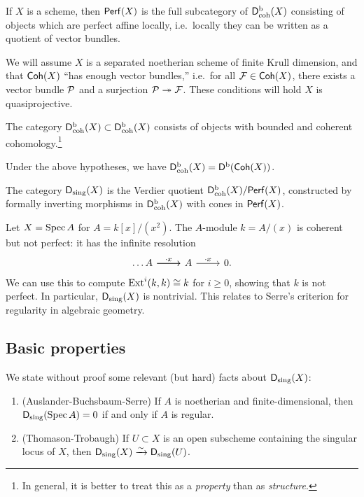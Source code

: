 \documentclass{article}
\begin{document}
\begin{dfn}
	If $X$ is a scheme, then $\mathsf{Perf}(X)$ is the full subcategory of $\mathsf{D}^\mathrm{b}_{\mathrm{coh}}(X)$ consisting of objects which are perfect affine locally, i.e.\ locally they can be written as a quotient of vector bundles.
\end{dfn}

We will assume $X$ is a separated noetherian scheme of finite Krull dimension, and that $\mathsf{Coh}(X)$ ``has enough vector bundles,'' i.e.\ for all $\mathcal{F} \in \mathsf{Coh}(X)$, there exists a vector bundle $\mathcal{P}$ and a surjection $\mathcal{P} \twoheadrightarrow \mathcal{F}$.
These conditions will hold $X$ is quasiprojective.

\begin{dfn}
	The category $\mathsf{D}^\mathrm{b}_{\mathrm{coh}}(X) \subset \mathsf{D}^\mathrm{b}_{\mathrm{coh}}(X)$ consists of objects with bounded and coherent cohomology.\footnote{In general, it is better to treat this as a \emph{property} than as \emph{structure}.}
\end{dfn}

Under the above hypotheses, we have $\mathsf{D}^\mathrm{b}_{\mathrm{coh}}(X) = \mathsf{D}^\mathrm{b}(\mathsf{Coh}(X))$.

\begin{dfn}
	The category $\mathsf{D}_{\mathrm{sing}}(X)$ is the Verdier quotient $\mathsf{D}^\mathrm{b}_{\mathrm{coh}}(X) / \mathsf{Perf}(X)$, constructed by formally inverting morphisms in $\mathsf{D}^\mathrm{b}_{\mathrm{coh}}(X)$ with cones in $\mathsf{Perf}(X)$.
\end{dfn}

\begin{ex}
	Let $X = \operatorname{Spec} A$ for $A = k[x] / (x^2)$.
	The $A$-module $k = A / (x)$ is coherent but not perfect: it has the infinite resolution
	\[
		\begin{tikzcd}
			\dots \rar A \rar["\cdot x"] & A \rar["\cdot x"] & 0.
		\end{tikzcd}
	\]
	We can use this to compute $\operatorname{Ext}^i(k, k) \cong k$ for $i \geq 0$, showing that $k$ is not perfect.
	In particular, $\mathsf{D}_{\mathrm{sing}}(X)$ is nontrivial.
	This relates to Serre's criterion for regularity in algebraic geometry.
\end{ex}

\subsection{Basic properties}

We state without proof some relevant (but hard) facts about $\mathsf{D}_{\mathrm{sing}}(X)$:
\begin{enumerate}
	\item (Auslander-Buchsbaum-Serre) If $A$ is noetherian and finite-dimensional, then $\mathsf{D}_{\mathrm{sing}}(\operatorname{Spec} A) = 0$ if and only if $A$ is regular.
	\item (Thomason-Trobaugh) If $U \subset X$ is an open subscheme containing the singular locus of $X$, then $\mathsf{D}_{\mathrm{sing}}(X) \xrightarrow{\sim} \mathsf{D}_{\mathrm{sing}}(U)$.
\end{enumerate}
\end{document}
